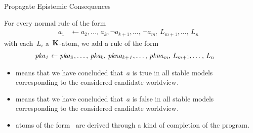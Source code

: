 \documentclass[aspectratio=169,svgnames,xcolor=table,t]{beamer}
\begin{document}
\begin{frame}{Propagate Epistemic Consequences}
    \begin{myitemize}
        \item[] For every normal rule of the form
        \begin{align}
            a_1 &\leftarrow 
            a_2,\!\dotsc\!,\,a_k,
            \neg a_{k+1},\!\dotsc\!,\,\neg a_m,\,
            {L_{m+1}},\!\dotsc\!,\,{L_n}
        \end{align}
        with each~$L_i$ a~$\mathbf{K}$-atom, we add a rule of the form
        \begin{gather}
            \begin{aligned}
                \kp{a_1} &\span\span\leftarrow 
                \kp{a_2},\dotsc,\,\kp{a_k},\,
                \kpnott{a_{k+1}},\dotsc,\,\kpnott{a_m},\,
                L_{m+1},\dotsc,\,L_n
            \end{aligned}
        \end{gather}
        \vspace*{-15pt}
        \begin{itemize}
            \item {} means that we have concluded that~$a$ is true in all stable models corresponding to the considered candidate worldview.
            \item {} means that we have concluded that~$a$ is false in all stable models corresponding to the considered candidate worldview.
            \item atoms of the form~ are derived through a kind of completion of the program.
        \end{itemize}
    \end{myitemize}
\end{frame}
\end{document}
